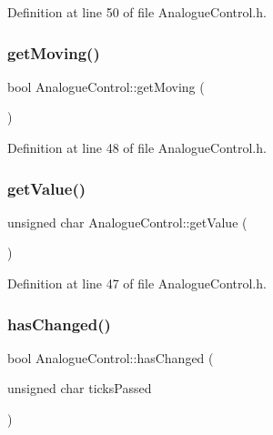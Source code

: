 Definition at line 50 of file Analogue\+Control.\+h.

\mbox{\label{class_analogue_control_a1c2b0439a77656ce62ddc69ee851cb86}} 
\subsubsection{\texorpdfstring{get\+Moving()}{getMoving()}}
{\footnotesize\ttfamily bool Analogue\+Control\+::get\+Moving (\begin{DoxyParamCaption}{ }\end{DoxyParamCaption})\hspace{0.3cm}{\ttfamily [inline]}}



Definition at line 48 of file Analogue\+Control.\+h.

\mbox{\label{class_analogue_control_ad92cad38f19cedae45aeeab748ddb455}} 
\subsubsection{\texorpdfstring{get\+Value()}{getValue()}}
{\footnotesize\ttfamily unsigned char Analogue\+Control\+::get\+Value (\begin{DoxyParamCaption}{ }\end{DoxyParamCaption})\hspace{0.3cm}{\ttfamily [inline]}}



Definition at line 47 of file Analogue\+Control.\+h.

\mbox{\label{class_analogue_control_ab670265f948d7416bcf07c91dcf97bce}} 
\subsubsection{\texorpdfstring{has\+Changed()}{hasChanged()}}
{\footnotesize\ttfamily bool Analogue\+Control\+::has\+Changed (\begin{DoxyParamCaption}\item[{unsigned char}]{ticks\+Passed }\end{DoxyParamCaption})}



